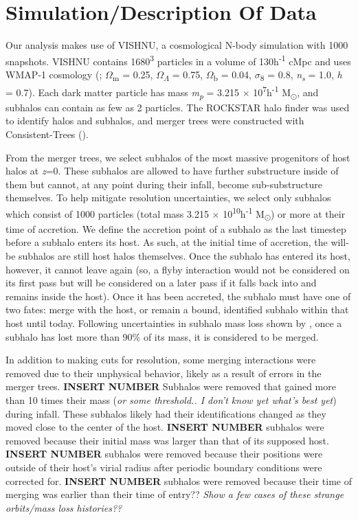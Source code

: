 \documentclass[fleqn,usenatbib]{mnras}
\begin{document}
\section{Simulation/Description Of Data}
	Our analysis makes use of VISHNU, a cosmological N-body simulation with 1000 snapshots. VISHNU contains 1680\textsuperscript{3} particles in a volume of 130h\textsuperscript{-1} cMpc and uses WMAP-1 cosmology (\citet{Springel2013}; $\Omega$\textsubscript{m} = 0.25, $\Omega$\textsubscript{$\Lambda$} = 0.75, $\Omega$\textsubscript{b} = 0.04, $\sigma$\textsubscript{8} = 0.8, \textit{n\textsubscript{s}} = 1.0, \textit{h} = 0.7). Each dark matter particle has mass \textit{m\textsubscript{p}} = 3.215 $\times$ 10\textsuperscript{7}h\textsuperscript{-1} M\textsubscript{\(\odot\)}, and subhalos can contain as few as 2 particles. The ROCKSTAR halo finder was used to identify halos and subhalos, and merger trees were constructed with Consistent-Trees (\citet{Behroozi2013b}).
\par
    From the merger trees, we select subhalos of the most massive progenitors of host halos at \textit{z}=0. These subhalos are allowed to have further substructure inside of them but cannot, at any point during their infall, become sub-substructure themselves. To help mitigate resolution uncertainties, we select only subhalos which consist of 1000 particles (total mass 3.215 $\times$ 10\textsuperscript{10}h\textsuperscript{-1} M\textsubscript{\(\odot\)}) or more at their time of accretion. We define the accretion point of a subhalo as the last timestep before a subhalo enters its host. As such, at the initial time of accretion, the will-be subhalos are still host halos themselves. Once the subhalo has entered its host, however, it cannot leave again (so, a flyby interaction would not be considered on its first pass but will be considered on a later pass if it falls back into and remains inside the host). Once it has been accreted, the subhalo must have one of two fates: merge with the host, or remain a bound, identified subhalo within that host until today. Following uncertainties in subhalo mass loss shown by \citet{VDB2018}, once a subhalo has lost more than 90\% of its mass, it is considered to be merged.
\par
    In addition to making cuts for resolution, some merging interactions were removed due to their unphysical behavior, likely as a result of errors in the merger trees. \textbf{INSERT NUMBER} Subhalos were removed that gained more than 10 times their mass (\textit{or some threshold.. I don't know yet what's best yet}) during infall. These subhalos likely had their identifications changed as they moved close to the center of the host. \textbf{INSERT NUMBER} subhalos were removed because their initial mass was larger than that of its supposed host. \textbf{INSERT NUMBER} subhalos were removed because their positions were outside of their host's virial radius after periodic boundary conditions were corrected for. \textbf{INSERT NUMBER} subhalos were removed because their time of merging was earlier than their time of entry?? \textit{Show a few cases of these strange orbits/mass loss histories??}
\end{document}
